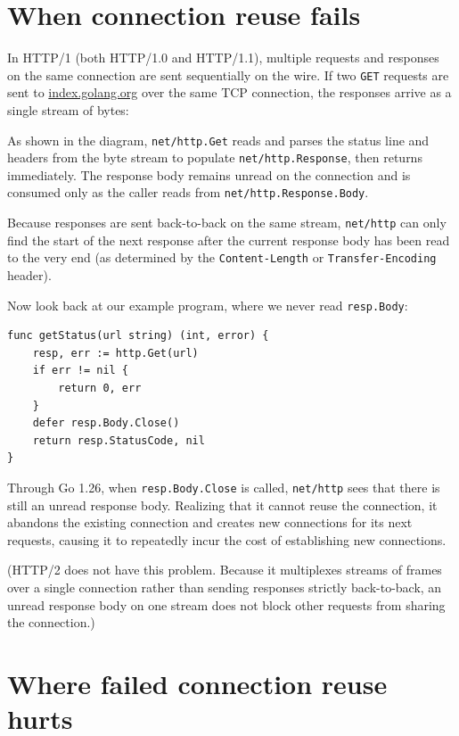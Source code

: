 \documentclass[11pt,a4paper]{article}
\begin{document}
\section{When connection reuse fails}

In HTTP/1 (both HTTP/1.0 and HTTP/1.1), multiple requests and responses on the same connection are sent sequentially on the wire. If two \texttt{GET} requests are sent to \href{https://index.golang.org/}{index.golang.org} over the same TCP connection, the responses arrive as a single stream of bytes:

\begin{figure}[h]
\end{figure}

As shown in the diagram, \texttt{net/http.Get} reads and parses the status line and headers from the byte stream to populate \texttt{net/http.Response}, then returns immediately. The response body remains unread on the connection and is consumed only as the caller reads from \texttt{net/http.Response.Body}.

Because responses are sent back-to-back on the same stream, \texttt{net/http} can only find the start of the next response after the current response body has been read to the very end (as determined by the \texttt{Content-Length} or \texttt{Transfer-Encoding} header).

Now look back at our example program, where we never read \texttt{resp.Body}:

\begin{verbatim}
func getStatus(url string) (int, error) {
    resp, err := http.Get(url)
    if err != nil {
        return 0, err
    }
    defer resp.Body.Close()
    return resp.StatusCode, nil
}
\end{verbatim}

Through Go 1.26, when \texttt{resp.Body.Close} is called, \texttt{net/http} sees that there is still an unread response body. Realizing that it cannot reuse the connection, it abandons the existing connection and creates new connections for its next requests, causing it to repeatedly incur the cost of establishing new connections.

(HTTP/2 does not have this problem. Because it multiplexes streams of frames over a single connection rather than sending responses strictly back-to-back, an unread response body on one stream does not block other requests from sharing the connection.)

\section{Where failed connection reuse hurts}
\end{document}
